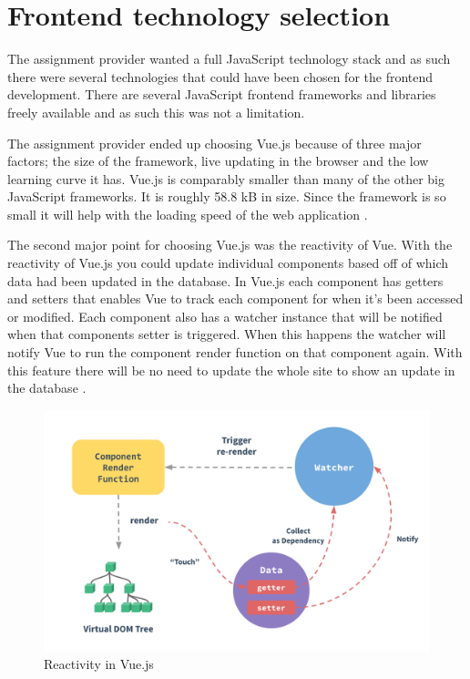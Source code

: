\section{Frontend technology selection} 
The assignment provider wanted a full JavaScript technology stack and as such there were several technologies that could have been chosen for the frontend development.
There are several JavaScript frontend frameworks and libraries freely available and as such this was not a limitation.

The assignment provider ended up choosing Vue.js because of three major factors; the size of the framework, live updating in the browser and the low learning curve it has. Vue.js is comparably smaller than many of the other big JavaScript frameworks. It is roughly 58.8 kB in size. Since the framework is so small it will help with the loading speed of the web application \cite{vue-size}. 

The second major point for choosing Vue.js was the reactivity of Vue. With the reactivity of Vue.js you could update individual components based off of which data had been updated in the database. In Vue.js each component has getters and setters that enables Vue to track each component for when it's been accessed or modified. Each component also has a watcher instance that will be notified when that components setter is triggered. When this happens the watcher will notify Vue to run the component render function on that component again. With this feature there will be no need to update the whole site to show an update in the database \cite{vue-reactivity}. 

\begin{figure}
    \centering
    \includegraphics[width=115mm,scale=1]{figures/reactivity.png}
    \caption{Reactivity in Vue.js}
    \label{fig:vue_reactivity}
\end{figure}

